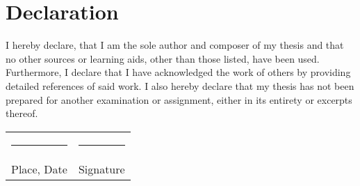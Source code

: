 
\chapter*{Declaration}

I hereby declare, that I am the sole author and composer of my thesis and that no other sources or learning aids, other than those listed, have been used. 
Furthermore, I declare that I have acknowledged the work of others by providing detailed references of said work.  \newline
I also hereby declare that my thesis has not been prepared for another examination or assignment, either in its entirety or excerpts thereof.
\\[3\normalbaselineskip]
\begin{tabular}{p{} l}
  \rule{\textwidth/3}{0.4pt}   &   \rule{\textwidth/3}{0.4pt} \\
  Place, Date                  &   Signature
\end{tabular}
